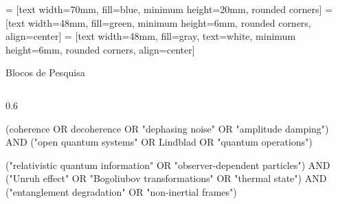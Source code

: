 \documentclass[aspectratio=169,usenames,dvipsnames,compress]{beamer}
\begin{document}
\begin{frame}{}

 = [text width=70mm, fill=blue,  minimum height=20mm, rounded corners]
 = [text width=48mm, fill=green, minimum height=6mm, rounded corners, align=center] 
 = [text width=48mm, fill=gray, text=white, minimum height=6mm, rounded corners, align=center] 


\end{frame}



\begin{frame}{Blocos de Pesquisa}

\begin{columns}
\begin{column}{0.6\textwidth}


\begin{tcolorbox}[fit to height=3     cm, title= Ruído como perda de coerênc] 

(coherence OR decoherence OR "dephasing noise" OR "amplitude damping")
AND ("open quantum systems" OR Lindblad OR "quantum operations")


("relativistic quantum information" OR "observer-dependent particles")
AND ("Unruh effect" OR "Bogoliubov transformations" OR "thermal state")
AND ("entanglement degradation" OR "non-inertial frames")

\end{tcolorbox}
\end{column}
\end{columns}
\end{frame}
\end{document}
